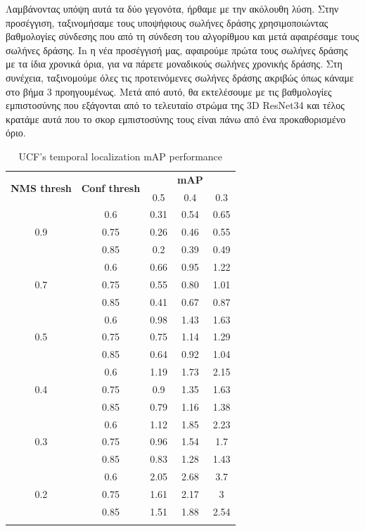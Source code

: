 \documentclass{report}
\begin{document}
Λαμβάνοντας υπόψη αυτά τα δύο γεγονότα, ήρθαμε με την ακόλουθη λύση. Στην
προσέγγιση, ταξινομήσαμε τους υποψήφιους σωλήνες δράσης χρησιμοποιώντας βαθμολογίες σύνδεσης που
από τη σύνδεση του αλγορίθμου και μετά αφαιρέσαμε τους σωλήνες δράσης. In
η νέα προσέγγισή μας, αφαιρούμε πρώτα τους σωλήνες δράσης με τα ίδια χρονικά όρια,
για να πάρετε μοναδικούς σωλήνες χρονικής δράσης. Στη συνέχεια, ταξινομούμε όλες τις προτεινόμενες
σωλήνες δράσης ακριβώς όπως κάναμε στο βήμα 3 προηγουμένως. Μετά από αυτό, θα εκτελέσουμε
με τις βαθμολογίες εμπιστοσύνης που εξάγονται από το τελευταίο στρώμα της
3D ResNet34 και τέλος κρατάμε αυτά που το σκορ εμπιστοσύνης τους είναι πάνω από ένα
προκαθορισμένο όριο.
\begin{center}
  \begin{longtable}{|| c | c || c c c ||}

    \hline
    \multirow{2}{*}{\textbf{NMS thresh}} & \multirow{2}{*}{\textbf{Conf thresh}} & {} & \textbf{mAP} & {}  \\
    {} & {} & 0.5 & 0.4 & 0.3\\
    \hline
    \multirow{3}{*}{0.9} & {0.6} & 0.31 & 0.54 & 0.65 \\
    \cline{2-5}
    {} & {0.75} & 0.26 & 0.46 & 0.55 \\
    \cline{2-5}
    {} & {0.85} & 0.2 & 0.39 & 0.49 \\
    \hline
    \multirow{3}{*}{0.7} & {0.6} & 0.66 & 0.95 & 1.22 \\
    \cline{2-5}
    {} & {0.75} & 0.55 & 0.80 & 1.01 \\
    \cline{2-5}
    {} & {0.85} & 0.41 & 0.67 & 0.87 \\
    \hline
    \multirow{3}{*}{0.5} & {0.6} & 0.98 & 1.43 & 1.63 \\
    \cline{2-5}
    {} & {0.75} & 0.75 & 1.14 & 1.29 \\
    \cline{2-5}
    {} & {0.85} & 0.64 & 0.92 & 1.04 \\
    \hline
    \multirow{3}{*}{0.4} & {0.6} & 1.19 & 1.73 & 2.15 \\
    \cline{2-5}
    {} & {0.75} & 0.9 & 1.35 & 1.63 \\
    \cline{2-5}
    {} & {0.85} & 0.79 & 1.16 & 1.38 \\

    \hline
    \multirow{3}{*}{0.3} & {0.6} & 1.12 & 1.85 & 2.23 \\
    \cline{2-5}
    {} & {0.75} & 0.96 & 1.54 &1.7 \\
    \cline{2-5}
    {} & {0.85} & 0.83 & 1.28 & 1.43 \\
    \hline
    \multirow{3}{*}{0.2} & {0.6} & 2.05 & 2.68 & 3.7 \\
    \cline{2-5}
    {} & {0.75} & 1.61 & 2.17 & 3 \\
    \cline{2-5}
    {} & {0.85} & 1.51 & 1.88 & 2.54 \\

    \hline

    \caption{UCF's temporal localization mAP performance}
    \label{table:temp_cls_2}
  \end{longtable}
\end{center}
\end{document}

